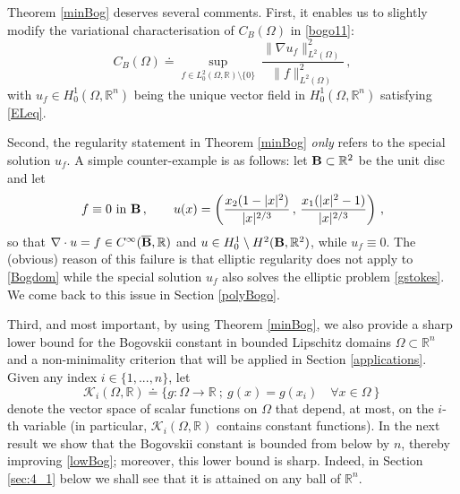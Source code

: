 \documentclass[11pt]{article}
\theoremstyle{plain}
\theoremstyle{definition}
\numberwithin{equation}{section}
\newcommand{\R}{\mathbb{R}}
\newcommand{\B}{{\bf B}}
\begin{document}
Theorem \ref{minBog} deserves several comments. First, it enables us to slightly modify the variational characterisation of $C_B(\Omega)$
in \eqref{bogo11}:
\begin{equation}\label{bogo}
C_B(\Omega) \doteq \sup_{f\in L^2_0(\Omega,\R) \setminus \{0\}} \ \dfrac{\| \nabla u_{f} \|_{L^2(\Omega)}^2}{\| f \|_{L^2(\Omega)}^2} \, ,
\end{equation}
with $u_{f} \in H_{0}^{1}(\Omega,\R^n)$ being the unique vector field in $H_{0}^{1}(\Omega,\R^n)$ satisfying \eqref{ELeq}.\par
Second, the regularity statement in Theorem \ref{minBog} {\em only} refers to the special solution $u_f$. A simple counter-example is
as follows: let $\B\subset\R^2$ be the unit disc and let
$$
f\equiv0\mbox{ in }\B\, ,\qquad u(x)=\left(\frac{x_2(1-|x|^2)}{|x|^{2/3}}\, ,\, \frac{x_1(|x|^2-1)}{|x|^{2/3}}\right)\, ,
$$
so that $\nabla\cdot u=f\in C^\infty(\overline{\B},\R)$ and $u\in H^1_0\setminus H^2(\B,\R^2)$, while $u_f\equiv0$.
The (obvious) reason of this failure is that elliptic regularity does not apply to \eqref{Bogdom} while the special solution $u_f$
also solves the elliptic problem \eqref{gstokes}. We come back to this issue in Section \ref{polyBogo}.\par
Third, and most important, by using Theorem \ref{minBog}, we also provide a sharp lower bound for the Bogovskii constant in
bounded  Lipschitz domains $\Omega\subset\R^n$ and a non-minimality criterion that will be applied in Section \ref{applications}.
Given any index $i \in \{1,...,n\}$, let
\begin{equation}\label{eq:def_K_i}
\mathcal{K}_{i}(\Omega, \mathbb{R}) \doteq \{ g : \Omega \to \mathbb{R} \ ; \ g(x)=g(x_i) \quad \forall x \in \Omega \ \} \, 
\end{equation}
denote the vector space of scalar functions on $\Omega$ that depend, at most, on the $i$-th variable (in particular, $\mathcal{K}_i(\Omega, \mathbb{R})$ contains constant functions).
In the next result we show that the Bogovskii constant is bounded from below by $n$, thereby improving \eqref{lowBog}; moreover, this lower bound is sharp.
Indeed, in Section \ref{sec:4_1} below we shall see that it is attained on any ball of $\R^n$.
\end{document}
